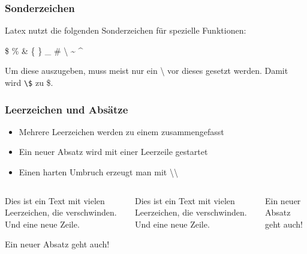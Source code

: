 \begin{frame}[fragile]
    \frametitle{Sonderzeichen}
    
    Latex nutzt die folgenden Sonderzeichen für spezielle Funktionen:
    \begin{center}
      \hfill \$
      \hfill \%
      \hfill \&
      \hfill \{
      \hfill \}
      \hfill \_
      \hfill \#
      \hfill \textbackslash
      \hfill \~{}
      \hfill \^{}
      \hfill
    \end{center}
    \pause
    Um diese auszugeben, muss meist nur ein \textbackslash{} vor dieses gesetzt werden.
    Damit wird \verb+\$+ zu \$.
\end{frame}


\begin{frame}[fragile]
    \frametitle{Leerzeichen und Absätze}
    
    \begin{itemize}
        \item Mehrere Leerzeichen werden zu einem zusammengefasst \pause
        \item Ein neuer Absatz wird mit einer Leerzeile gestartet\pause
        \item Einen harten Umbruch erzeugt man mit \textbackslash\textbackslash
    \end{itemize}
    \pause    
    
    \begin{columns}[c]
            \begin{verbatim*}
Dies ist ein Text  mit
vielen   Leerzeichen, die
verschwinden.
Und eine neue  Zeile.

Ein neuer Absatz geht auch!
\end{verbatim*}
        \pause
        Dies ist ein Text  mit
        vielen   Leerzeichen, die
        verschwinden.
        Und eine neue  Zeile.\medskip

        Ein neuer Absatz geht auch!
\end{columns}
\end{frame}